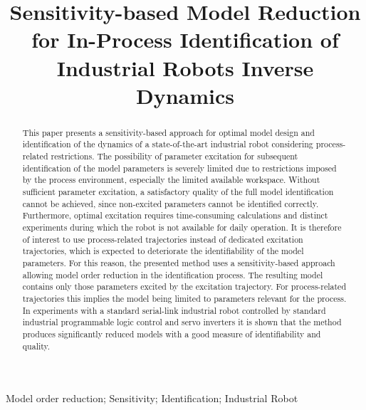 \documentclass[conference,letterpaper]{IEEEtran}
\begin{document}
\title{Sensitivity-based Model Reduction for In-Process Identification of Industrial Robots Inverse Dynamics}

\author{
}

\maketitle

\begin{abstract}
This paper presents a sensitivity-based approach for optimal model design and identification of the dynamics of a state-of-the-art industrial robot considering process-related restrictions.
The possibility of parameter excitation for subsequent identification of the model parameters is severely limited due to restrictions imposed by the process environment, especially the limited available workspace. 
Without sufficient parameter excitation, a satisfactory quality of the full model identification cannot be achieved, since non-excited parameters cannot be identified correctly.  
Furthermore, optimal excitation requires time-consuming calculations and distinct experiments during which the robot is not available for daily operation. 
It is therefore of interest to use process-related trajectories instead of dedicated excitation trajectories, which is expected to deteriorate the identifiability of the model parameters.
For this reason, the presented method uses a sensitivity-based approach allowing model order reduction in the identification process. The resulting model contains only those parameters excited by the excitation trajectory. For process-related trajectories this implies the model being limited to parameters relevant for the process. 
In experiments with a standard serial-link industrial robot controlled by standard industrial programmable logic control and servo inverters it is shown that the method produces significantly reduced models with a good measure of identifiability and quality.
\end{abstract}

\begin{keywords}
Model order reduction; Sensitivity; Identification; Industrial Robot
\end{keywords}
\end{document}
